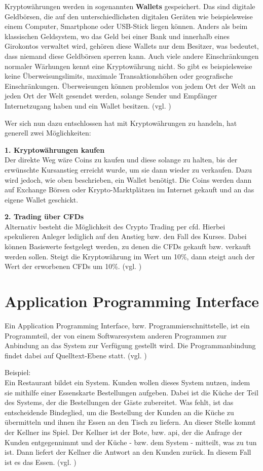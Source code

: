 \documentclass[oneside]{ausarbeitung}
\begin{document}
Kryptowährungen werden in sogenannten \textbf{Wallets} gespeichert.
Das sind digitale Geldbörsen, die auf den unterschiedlichsten
digitalen Geräten wie beispielsweise einem Computer, Smartphone oder
USB-Stick liegen können. Anders als beim klassischen Geldsystem, wo
das Geld bei einer Bank und innerhalb eines Girokontos verwaltet wird,
gehören diese Wallets nur dem Besitzer, was bedeutet, dass niemand
diese Geldbörsen sperren kann. Auch viele andere Einschränkungen
normaler Wärhungen kennt eine Kryptowährung nicht. So gibt es
beispielsweise keine Überweisungslimits, maximale Transaktionshöhen
oder geografische Einschränkungen. Überweisungen können problemlos
von jedem Ort der Welt an jeden Ort der Welt gesendet werden, solange
Sender und Empfänger Internetzugang haben und ein Wallet besitzen.
(vgl. \cite{bitcoins_erklärung})

Wer sich nun dazu entschlossen hat mit Kryptowährungen zu handeln,
hat generell zwei Möglichkeiten:

\textbf{1. Kryptowährungen kaufen} \\
Der direkte Weg wäre Coins zu kaufen und diese solange zu halten, bis
der erwünschte Kursanstieg erreicht wurde, um sie dann wieder zu
verkaufen. Dazu wird jedoch, wie oben beschrieben, ein Wallet
benötigt. Die Coins werden dann auf Exchange Börsen oder
Krypto-Marktplätzen im Internet gekauft und an das eigene Wallet
geschickt.  

\textbf{2. Trading über CFDs} \\
Alternativ besteht die Möglichkeit des Crypto Trading per \ac{cfd}.
Hierbei spekulieren Anleger lediglich auf den Anstieg bzw. den Fall
des Kurses. Dabei können Basiswerte festgelegt werden, zu
denen die CFDs gekauft bzw. verkauft werden sollen. Steigt die 
Kryptowährung im Wert um 10\%, dann steigt auch der Wert der 
erworbenen CFDs um 10\%. (vgl. \cite{crypto_trading})


\section{Application Programming Interface}
\label{sec:api}

Ein Application Programming Interface, bzw. Programmierschnittstelle,
ist ein Programmteil, der von einem Softwaresystem anderen Programmen
zur Anbindung an das System zur Verfügung gestellt wird. Die
Programmanbindung findet dabei auf Quelltext-Ebene statt. (vgl.
\cite{api_definition})

Beispiel: \\
Ein Restaurant bildet ein System. Kunden wollen dieses System nutzen,
indem sie mithilfe einer Essenskarte Bestellungen aufgeben. Dabei ist
die Küche der Teil des Systems, der die Bestellungen der Gäste
zubereitet. Was fehlt, ist das entscheidende Bindeglied, um die
Bestellung der Kunden an die Küche zu übermitteln und ihnen ihr
Essen an den Tisch zu liefern. An dieser Stelle kommt der Kellner ins
Spiel. Der Kellner ist der Bote, bzw. \ac{api}, der die Anfrage der
Kunden entgegennimmt und der Küche - bzw. dem System - mitteilt, was
zu tun ist. Dann liefert der Kellner die Antwort an den Kunden
zurück. In diesem Fall ist es das Essen. (vgl. \cite{api_example})    
\end{document}
